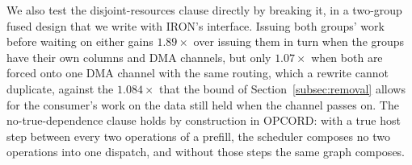 We also test the disjoint-resources clause directly by breaking it, in a two-group fused design that we write with IRON's interface.
Issuing both groups' work before waiting on either gains $1.89\times$ over issuing them in turn when the groups have their own columns and DMA channels, but only $1.07\times$ when both are forced onto one DMA channel with the same routing, which a rewrite cannot duplicate, against the $1.084\times$ that the bound of Section~\ref{subsec:removal} allows for the consumer's work on the data still held when the channel passes on.
The no-true-dependence clause holds by construction in OPCORD: with a true host step between every two operations of a prefill, the scheduler composes no two operations into one dispatch, and without those steps the same graph composes.
